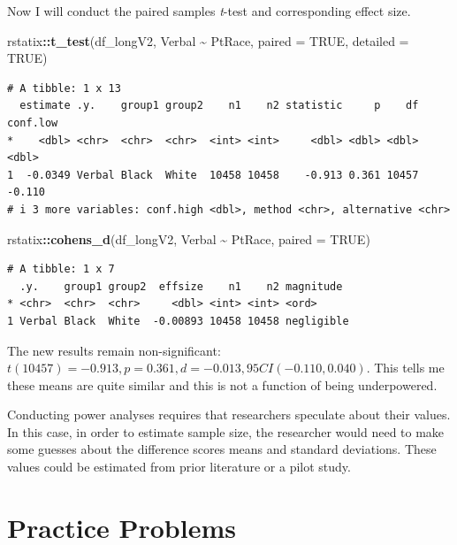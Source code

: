 \documentclass[
  11pt,
]{book}
\newenvironment{Shaded}{\begin{snugshade}}{\end{snugshade}}
\newcommand{\AttributeTok}[1]{\textcolor[rgb]{0.27,0.27,0.27}{#1}}
\newcommand{\ConstantTok}[1]{\textcolor[rgb]{0.37,0.37,0.37}{#1}}
\newcommand{\FunctionTok}[1]{\textcolor[rgb]{0.27,0.27,0.27}{\textbf{#1}}}
\newcommand{\NormalTok}[1]{#1}
\newcommand{\SpecialCharTok}[1]{\textcolor[rgb]{0.43,0.43,0.43}{\textbf{#1}}}
\begin{document}
Now I will conduct the paired samples \emph{t}-test and corresponding effect size.

\begin{Shaded}
\begin{Highlighting}[]
\NormalTok{rstatix}\SpecialCharTok{::}\FunctionTok{t\_test}\NormalTok{(df\_longV2, Verbal }\SpecialCharTok{\textasciitilde{}}\NormalTok{ PtRace, }\AttributeTok{paired =} \ConstantTok{TRUE}\NormalTok{, }\AttributeTok{detailed =} \ConstantTok{TRUE}\NormalTok{)}
\end{Highlighting}
\end{Shaded}

\begin{verbatim}
# A tibble: 1 x 13
  estimate .y.    group1 group2    n1    n2 statistic     p    df conf.low
*    <dbl> <chr>  <chr>  <chr>  <int> <int>     <dbl> <dbl> <dbl>    <dbl>
1  -0.0349 Verbal Black  White  10458 10458    -0.913 0.361 10457   -0.110
# i 3 more variables: conf.high <dbl>, method <chr>, alternative <chr>
\end{verbatim}

\begin{Shaded}
\begin{Highlighting}[]
\NormalTok{rstatix}\SpecialCharTok{::}\FunctionTok{cohens\_d}\NormalTok{(df\_longV2, Verbal }\SpecialCharTok{\textasciitilde{}}\NormalTok{ PtRace, }\AttributeTok{paired =} \ConstantTok{TRUE}\NormalTok{)}
\end{Highlighting}
\end{Shaded}

\begin{verbatim}
# A tibble: 1 x 7
  .y.    group1 group2  effsize    n1    n2 magnitude 
* <chr>  <chr>  <chr>     <dbl> <int> <int> <ord>     
1 Verbal Black  White  -0.00893 10458 10458 negligible
\end{verbatim}

The new results remain non-significant: \(t(10457) = -0.913, p = 0.361, d = -0.013, 95CI (-0.110, 0.040)\). This tells me these means are quite similar and this is not a function of being underpowered.

Conducting power analyses requires that researchers speculate about their values. In this case, in order to estimate sample size, the researcher would need to make some guesses about the difference scores means and standard deviations. These values could be estimated from prior literature or a pilot study.

\hypertarget{practice-problems-4}{%
\section{Practice Problems}\label{practice-problems-4}}
\end{document}
